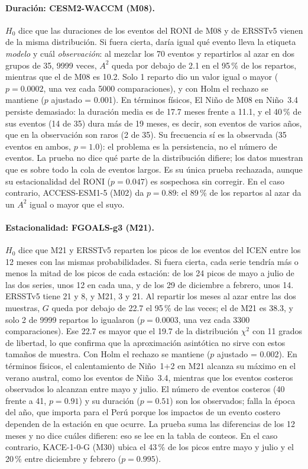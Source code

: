 \documentclass[11pt,a4paper]{article}
\begin{document}
\paragraph{Duración: CESM2-WACCM (M08).} $H_0$ dice que las duraciones de los eventos del RONI de M08 y de ERSSTv5 vienen de la misma distribución. Si fuera cierta, daría igual qué evento lleva la etiqueta \emph{modelo} y cuál \emph{observación}: al mezclar los 70 eventos y repartirlos al azar en dos grupos de 35, 9999 veces, $A^2$ queda por debajo de 2.1 en el 95\,\% de los repartos, mientras que el de M08 es 10.2. Solo 1 reparto dio un valor igual o mayor ($p = 0.0002$, una vez cada 5000 comparaciones), y con Holm el rechazo se mantiene ($p$ ajustado = 0.001). En términos físicos, El Niño de M08 en Niño~3.4 persiste demasiado: la duración media es de 17.7 meses frente a 11.1, y el 40\,\% de sus eventos (14 de 35) dura más de 19 meses, es decir, son eventos de varios años, que en la observación son raros (2 de 35). Su frecuencia sí es la observada (35 eventos en ambos, $p = 1.0$): el problema es la persistencia, no el número de eventos. La prueba no dice qué parte de la distribución difiere; los datos muestran que es sobre todo la cola de eventos largos. Es su única prueba rechazada, aunque su estacionalidad del RONI ($p = 0.047$) es sospechosa sin corregir. En el caso contrario, ACCESS-ESM1-5 (M02) da $p = 0.89$: el 89\,\% de los repartos al azar da un $A^2$ igual o mayor que el suyo.

\paragraph{Estacionalidad: FGOALS-g3 (M21).} $H_0$ dice que M21 y ERSSTv5 reparten los picos de los eventos del ICEN entre los 12 meses con las mismas probabilidades. Si fuera cierta, cada serie tendría más o menos la mitad de los picos de cada estación: de los 24 picos de mayo a julio de las dos series, unos 12 en cada una, y de los 29 de diciembre a febrero, unos 14. ERSSTv5 tiene 21 y 8, y M21, 3 y 21. Al repartir los meses al azar entre las dos muestras, $G$ queda por debajo de 22.7 el 95\,\% de las veces; el de M21 es 38.3, y solo 2 de 9999 repartos lo igualaron ($p = 0.0003$, una vez cada 3300 comparaciones). Ese 22.7 es mayor que el 19.7 de la distribución $\chi^2$ con 11 grados de libertad, lo que confirma que la aproximación asintótica no sirve con estos tamaños de muestra. Con Holm el rechazo se mantiene ($p$ ajustado = 0.002). En términos físicos, el calentamiento de Niño~1+2 en M21 alcanza su máximo en el verano austral, como los eventos de Niño~3.4, mientras que los eventos costeros observados lo alcanzan entre mayo y julio. El número de eventos costeros (40 frente a 41, $p = 0.91$) y su duración ($p = 0.51$) son los observados; falla la época del año, que importa para el Perú porque los impactos de un evento costero dependen de la estación en que ocurre. La prueba suma las diferencias de los 12 meses y no dice cuáles difieren: eso se lee en la tabla de conteos. En el caso contrario, KACE-1-0-G (M30) ubica el 43\,\% de los picos entre mayo y julio y el 20\,\% entre diciembre y febrero ($p = 0.995$).
\end{document}
